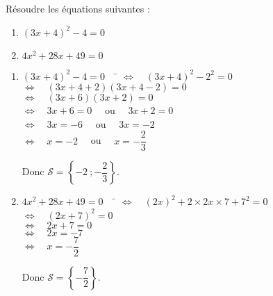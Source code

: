 \documentclass[a4paper,11pt,exos]{nsi} %
\begin{document}
\maketitle

\begin{exercice}
    Résoudre les équations suivantes :
    \begin{multicols}{2}
        \begin{enumerate}
            \item $(3x+4)^2-4=0$
	        \item $4x^2+28x+49=0$
        \end{enumerate}
    \end{multicols}
    
\end{exercice}

\begin{enumerate}
    \item \begin{tabbing}
        $(3x+4)^2-4=0 \quad$    \=  $\iff\quad (3x+4)^2-2^2=0$\\
        \>  $\iff\quad  (3x+4+2)(3x+4-2)=0$\\
        \>  $\iff\quad  (3x+6)(3x+2)=0$\\
        \>  $\iff\quad  3x+6=0 \quad$ ou $\quad 3x+2=0$\\
        \>  $\iff\quad  3x=-6\quad$ ou $\quad 3x = -2$\\
        \>  $\iff\quad  x=-2\quad$ ou $\quad x=-\dfrac{2}{3}$
    \end{tabbing}
    Donc $\mathcal{S}=\left\{-2\ ; -\dfrac{2}{3} \right\}$.

    \item \begin{tabbing}
        $4x^2+28x+49=0 \quad$    \=  $\iff\quad (2x)^2+2\times 2x\times 7+7^2=0$\\
        \>  $\iff\quad  (2x+7)^2=0$\\
        \>  $\iff\quad  2x+7=0$\\
        \>  $\iff\quad  2x=-7$\\
        \>  $\iff\quad  x=-\dfrac{7}{2}$
    \end{tabbing}
    Donc $\mathcal{S}=\left\{-\dfrac{7}{2} \right\}$.
\end{enumerate}
\end{document}
